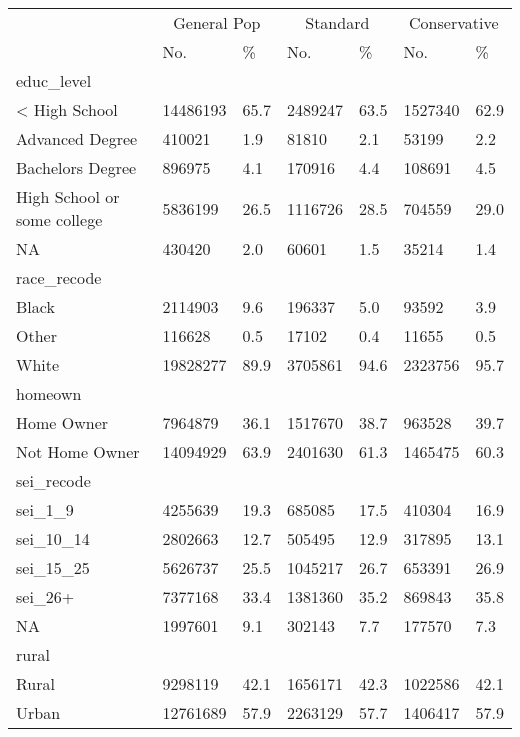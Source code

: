\captionsetup[table]{labelformat=empty,skip=1pt}
\begin{longtable}{lllllll}
\toprule
& \multicolumn{2}{c}{General Pop} & \multicolumn{2}{c}{Standard} & \multicolumn{2}{c}{Conservative} \\ 
 \cmidrule(lr){2-3}\cmidrule(lr){4-5}\cmidrule(lr){6-7}
 & No. & \% & No. & \% & No. & \% \\ 
\midrule
\multicolumn{1}{l}{educ\_level} \\ 
\midrule
< High School & 14486193 & 65.7 & 2489247 & 63.5 & 1527340 & 62.9 \\ 
Advanced Degree & 410021 & 1.9 & 81810 & 2.1 & 53199 & 2.2 \\ 
Bachelors Degree & 896975 & 4.1 & 170916 & 4.4 & 108691 & 4.5 \\ 
High School or some college & 5836199 & 26.5 & 1116726 & 28.5 & 704559 & 29.0 \\ 
NA & 430420 & 2.0 & 60601 & 1.5 & 35214 & 1.4 \\ 
\midrule
\multicolumn{1}{l}{race\_recode} \\ 
\midrule
Black & 2114903 & 9.6 & 196337 & 5.0 & 93592 & 3.9 \\ 
Other & 116628 & 0.5 & 17102 & 0.4 & 11655 & 0.5 \\ 
White & 19828277 & 89.9 & 3705861 & 94.6 & 2323756 & 95.7 \\ 
\midrule
\multicolumn{1}{l}{homeown} \\ 
\midrule
Home Owner & 7964879 & 36.1 & 1517670 & 38.7 & 963528 & 39.7 \\ 
Not Home Owner & 14094929 & 63.9 & 2401630 & 61.3 & 1465475 & 60.3 \\ 
\midrule
\multicolumn{1}{l}{sei\_recode} \\ 
\midrule
sei\_1\_9 & 4255639 & 19.3 & 685085 & 17.5 & 410304 & 16.9 \\ 
sei\_10\_14 & 2802663 & 12.7 & 505495 & 12.9 & 317895 & 13.1 \\ 
sei\_15\_25 & 5626737 & 25.5 & 1045217 & 26.7 & 653391 & 26.9 \\ 
sei\_26+ & 7377168 & 33.4 & 1381360 & 35.2 & 869843 & 35.8 \\ 
NA & 1997601 & 9.1 & 302143 & 7.7 & 177570 & 7.3 \\ 
\midrule
\multicolumn{1}{l}{rural} \\ 
\midrule
Rural & 9298119 & 42.1 & 1656171 & 42.3 & 1022586 & 42.1 \\ 
Urban & 12761689 & 57.9 & 2263129 & 57.7 & 1406417 & 57.9 \\ 

\end{longtable}
